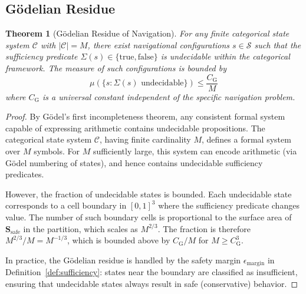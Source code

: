 \documentclass[twocolumn,10pt]{article}
\newtheorem{theorem}{Theorem}[section]
\theoremstyle{definition}
\theoremstyle{remark}
\newcommand{\Sent}{\mathbf{S}}
\begin{document}
\subsection{G\"odelian Residue}

\begin{theorem}[G\"odelian Residue of Navigation]\label{thm:godelian}
For any finite categorical state system $\mathcal{C}$ with $|\mathcal{C}| = M$,
there exist navigational configurations $s \in \mathcal{S}$ such that the
sufficiency predicate $\Sigma(s) \in \{\mathrm{true}, \mathrm{false}\}$ is
undecidable within the categorical framework. The measure of such
configurations is bounded by
\begin{equation}\label{eq:godelian-bound}
  \mu(\{s : \Sigma(s) \text{ undecidable}\}) \leq \frac{C_{\mathrm{G}}}{M}
\end{equation}
where $C_{\mathrm{G}}$ is a universal constant independent of the specific
navigation problem.
\end{theorem}

\begin{proof}
By G\"odel's first incompleteness theorem, any consistent formal system
capable of expressing arithmetic contains undecidable propositions. The
categorical state system $\mathcal{C}$, having finite cardinality $M$,
defines a formal system over $M$ symbols. For $M$ sufficiently large,
this system can encode arithmetic (via G\"odel numbering of states), and
hence contains undecidable sufficiency predicates.

However, the fraction of undecidable states is bounded. Each undecidable
state corresponds to a cell boundary in $[0,1]^3$ where the sufficiency
predicate changes value. The number of such boundary cells is proportional
to the surface area of $\Sent_{\mathrm{safe}}$ in the partition, which
scales as $M^{2/3}$. The fraction is therefore $M^{2/3}/M = M^{-1/3}$,
which is bounded above by $C_{\mathrm{G}}/M$ for $M \geq C_{\mathrm{G}}^3$.

In practice, the G\"odelian residue is handled by the safety margin
$\epsilon_{\mathrm{margin}}$ in Definition~\ref{def:sufficiency}: states
near the boundary are classified as insufficient, ensuring that
undecidable states always result in safe (conservative) behavior.
\end{proof}
\end{document}
